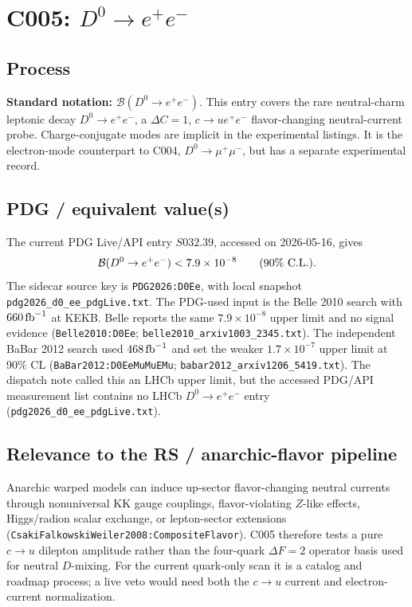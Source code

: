 
\section{\texorpdfstring{C005: \(D^0\to e^+e^-\)}{C005: D0 -> e+e-}}

\subsection*{Process}
\textbf{Standard notation:} \(\mathcal{B}(D^0\to e^+e^-)\).  This entry
covers the rare neutral-charm leptonic decay \(D^0\to e^+e^-\), a
\(\Delta C=1\), \(c\to u e^+e^-\) flavor-changing neutral-current probe.
Charge-conjugate modes are implicit in the experimental listings.  It is the
electron-mode counterpart to C004, \(D^0\to\mu^+\mu^-\), but has a separate
experimental record.

\subsection*{PDG / equivalent value(s)}
The current PDG Live/API entry \(S032.39\), accessed on 2026-05-16, gives
\[
  \mathcal{B}(D^0\to e^+e^-) < 7.9\times10^{-8}
  \qquad (90\%~{\rm C.L.}).
\]
The sidecar source key is \texttt{PDG2026:D0Ee}, with local snapshot
\texttt{pdg2026\_d0\_ee\_pdgLive.txt}.  The PDG-used input is the Belle 2010
search with \(660\,{\rm fb}^{-1}\) at KEKB.  Belle reports the same
\(7.9\times10^{-8}\) upper limit and no signal evidence
(\texttt{Belle2010:D0Ee};
\texttt{belle2010\_arxiv1003\_2345.txt}).  The independent BaBar 2012 search
used \(468\,{\rm fb}^{-1}\) and set the weaker \(1.7\times10^{-7}\) upper
limit at 90\% CL
(\texttt{BaBar2012:D0EeMuMuEMu};
\texttt{babar2012\_arxiv1206\_5419.txt}).  The dispatch note called this an
LHCb upper limit, but the accessed PDG/API measurement list contains no LHCb
\(D^0\to e^+e^-\) entry
(\texttt{pdg2026\_d0\_ee\_pdgLive.txt}).

\subsection*{Relevance to the RS / anarchic-flavor pipeline}
Anarchic warped models can induce up-sector flavor-changing neutral currents
through nonuniversal KK gauge couplings, flavor-violating \(Z\)-like effects,
Higgs/radion scalar exchange, or lepton-sector extensions
(\texttt{CsakiFalkowskiWeiler2008:CompositeFlavor}).  C005 therefore tests a
pure \(c\to u\) dilepton amplitude rather than the four-quark \(\Delta F=2\)
operator basis used for neutral \(D\)-mixing.  For the current quark-only scan
it is a catalog and roadmap process; a live veto would need both the
\(c\to u\) current and electron-current normalization.

